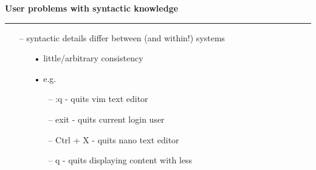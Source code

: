 \documentclass[pdf]{beamer}
\begin{document}
\begin{frame}
\vspace{8mm}
\textcolor{myBlue}{\textbf{\Large{User problems with syntactic knowledge}}}

\textcolor{red}{\rule{10cm}{1mm}}

\begin{small}

	\begin{itemize}
	\item[\textcolor{black}{--}] syntactic details differ between (and within!) systems
		  \begin{itemize}
		  \item[\textcolor{black}{•}] little/arbitrary consistency 
          \item[\textcolor{black}{•}] e.g. 
                 \begin{itemize}
                 \item[\textcolor{black}{--}] :q - quits vim text editor
                  \item[\textcolor{black}{--}] exit - quits current login user
                  \item[\textcolor{black}{--}] Ctrl + X - quits nano text editor
                  \item[\textcolor{black}{--}] q - quits displaying content with less
                 \end{itemize}
          \end{itemize}
	\end{itemize}

\end{small}
\end{frame}
\end{document}
